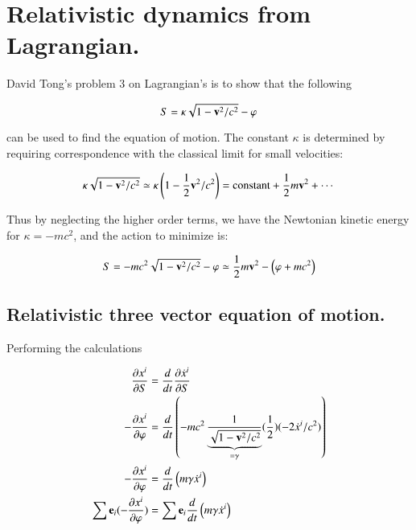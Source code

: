 \documentclass{article}      %
\title{} %
\author{Peeter Joot \quad peeter.joot@gmail.com}         %
\date{ June 10, 2008.  Last Revision: $Date: 2009/06/03 20:01:38 $ }
\begin{document}

\maketitle{}

\section{Relativistic dynamics from Lagrangian. }

David Tong's problem 3 on Lagrangian's is to show that the following

\begin{equation}
S = \kappa \sqrt{1 - \Bv^2/c^2} - \varphi
\end{equation}

can be used to find the equation of motion.  The constant $\kappa$ is determined
by requiring correspondence with the classical limit for small velocities:

\begin{equation*}
\kappa \sqrt{1 - \Bv^2/c^2} \simeq \kappa \left( 1 - \inv{2} \Bv^2/c^2 \right) = \text{constant} + \inv{2} m \Bv^2 + \cdots
\end{equation*}

Thus by neglecting the higher order terms, we have the Newtonian kinetic energy for $\kappa = -mc^2$, and the action to minimize is:

\begin{equation}
S = -m c^2\sqrt{1 - \Bv^2/c^2} - \varphi \simeq \inv{2}m \Bv^2 - \left(\varphi + m c^2\right)
\end{equation}

\subsection{Relativistic three vector equation of motion. }

Performing the calculations

\begin{align*}
\PD{S}{x^i} &= \frac{d}{dt} \PD{S}{\dot{x}^i} \\
-\PD{\varphi}{x^i} &= \frac{d}{dt} \left(-mc^2 \underbrace{\inv{\sqrt{1-\Bv^2/c^2}}}_{=\gamma} (\inv{2})(-2\dot{x}^i/c^2)\right) \\
-\PD{\varphi}{x^i} &= \frac{d}{dt} \left( m \gamma \dot{x}^i\right) \\
\sum \Be_i (-\PD{\varphi}{x^i}) &= \sum \Be_i \frac{d}{dt} \left( m \gamma \dot{x}^i\right) \\
\end{align*}
\end{document}
